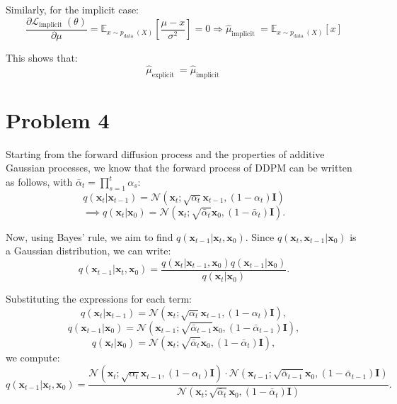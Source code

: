 \documentclass{article}
\begin{document}
\begin{enumerate}
Similarly, for the implicit case:
$$
\frac{\partial \mathcal{L}_{\text {implicit }}(\theta)}{\partial \mu}=\mathbb{E}_{x \sim p_{\text {data }}(X)}\left[\frac{\mu-x}{\sigma^2}\right]=0 \Longrightarrow \hat{\mu}_{\text {implicit }}=\mathbb{E}_{x \sim p_{\text {data }}(X)}[x]
$$

This shows that:
$$
\hat{\mu}_{\text {explicit }}=\hat{\mu}_{\text {implicit }}
$$
 
\end{enumerate}
\section{Problem 4}

Starting from the forward diffusion process and the properties of additive Gaussian processes, we know that the forward process of DDPM can be written as follows, with $\bar{\alpha}_t = \prod_{s=1}^t \alpha_s$:
\[
q(\mathbf{x}_t | \mathbf{x}_{t-1}) = \mathcal{N}(\mathbf{x}_t; \sqrt{\alpha_t} \mathbf{x}_{t-1}, (1 - \alpha_t) \mathbf{I}) 
\]
\[
\implies q(\mathbf{x}_t | \mathbf{x}_0) = \mathcal{N}(\mathbf{x}_t; \sqrt{\bar{\alpha}_t} \mathbf{x}_0, (1 - \bar{\alpha}_t) \mathbf{I}).
\]

Now, using Bayes' rule, we aim to find $q(\mathbf{x}_{t-1} | \mathbf{x}_t, \mathbf{x}_0)$. Since $q(\mathbf{x}_t, \mathbf{x}_{t-1} | \mathbf{x}_0)$ is a Gaussian distribution, we can write:
\[
q(\mathbf{x}_{t-1} | \mathbf{x}_t, \mathbf{x}_0) = \frac{q(\mathbf{x}_t | \mathbf{x}_{t-1}, \mathbf{x}_0) q(\mathbf{x}_{t-1} | \mathbf{x}_0)}{q(\mathbf{x}_t | \mathbf{x}_0)}.
\]

Substituting the expressions for each term:
\[
q(\mathbf{x}_t | \mathbf{x}_{t-1}) = \mathcal{N}(\mathbf{x}_t; \sqrt{\alpha_t} \mathbf{x}_{t-1}, (1 - \alpha_t) \mathbf{I}),
\]
\[
q(\mathbf{x}_{t-1} | \mathbf{x}_0) = \mathcal{N}(\mathbf{x}_{t-1}; \sqrt{\bar{\alpha}_{t-1}} \mathbf{x}_0, (1 - \bar{\alpha}_{t-1}) \mathbf{I}),
\]
\[
q(\mathbf{x}_t | \mathbf{x}_0) = \mathcal{N}(\mathbf{x}_t; \sqrt{\bar{\alpha}_t} \mathbf{x}_0, (1 - \bar{\alpha}_t) \mathbf{I}),
\]
we compute:
\[
q(\mathbf{x}_{t-1} | \mathbf{x}_t, \mathbf{x}_0) = 
\frac{\mathcal{N}(\mathbf{x}_t; \sqrt{\alpha_t} \mathbf{x}_{t-1}, (1 - \alpha_t) \mathbf{I}) 
\cdot \mathcal{N}(\mathbf{x}_{t-1}; \sqrt{\bar{\alpha}_{t-1}} \mathbf{x}_0, (1 - \bar{\alpha}_{t-1}) \mathbf{I})}
{\mathcal{N}(\mathbf{x}_t; \sqrt{\bar{\alpha}_t} \mathbf{x}_0, (1 - \bar{\alpha}_t) \mathbf{I})}.
\]
\end{document}

